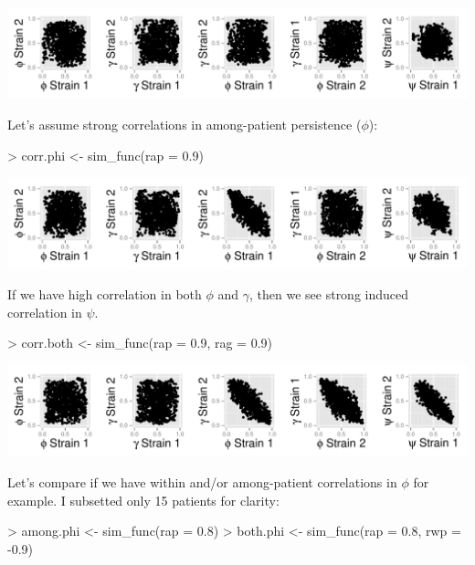 \documentclass{article}
\begin{document}
\begin{center}
\includegraphics{ReadMe-002}
\end{center}

Let's assume strong correlations in among-patient persistence ($\phi$):
\begin{Schunk}
\begin{Sinput}
> corr.phi <- sim_func(rap = 0.9)
\end{Sinput}
\end{Schunk}

\begin{center}
\includegraphics{ReadMe-004}
\end{center}

If we have high correlation in both $\phi$ and $\gamma$, then we see strong induced correlation in $\psi$.

\begin{Schunk}
\begin{Sinput}
> corr.both <- sim_func(rap = 0.9, rag = 0.9)
\end{Sinput}
\end{Schunk}

\begin{center}
\includegraphics{ReadMe-006}
\end{center}

Let's compare if we have within and/or among-patient correlations in $\phi$ for example. I subsetted only 15 patients for clarity:

\begin{Schunk}
\begin{Sinput}
> among.phi <- sim_func(rap = 0.8)
> both.phi <- sim_func(rap = 0.8, rwp = -0.9)
\end{Sinput}
\end{Schunk}
\end{document}
